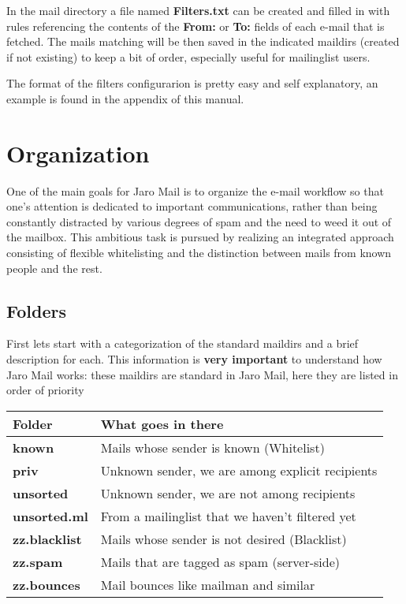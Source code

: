 \documentclass[a4,onecolumn,portrait]{article}
\begin{document}
In the mail directory a file named \textbf{Filters.txt} can be created and
filled in with rules referencing the contents of the \textbf{From:}
or \textbf{To:} fields of each e-mail that is fetched. The mails matching
will be then saved in the indicated maildirs (created if not
existing) to keep a bit of order, especially useful for mailinglist
users.

The format of the filters configurarion is pretty easy and self
explanatory, an example is found in the appendix of this manual.

\section{Organization}
\label{sec-5}

One of the main goals for Jaro Mail is to organize the e-mail workflow
so that one's attention is dedicated to important communications,
rather than being constantly distracted by various degrees of spam and
the need to weed it out of the mailbox. This ambitious task is pursued
by realizing an integrated approach consisting of flexible
whitelisting and the distinction between mails from known people and
the rest.

\subsection{Folders}
\label{sec-5-1}

First lets start with a categorization of the standard maildirs and a
brief description for each. This information is \textbf{very important} to
understand how Jaro Mail works: these maildirs are standard in Jaro
Mail, here they are listed in order of priority

\begin{center}
\begin{tabular}{ll}
Folder & What goes in there\\
\hline
\textbf{known} & Mails whose sender is known (Whitelist)\\
\textbf{priv} & Unknown sender, we are among explicit recipients\\
\textbf{unsorted} & Unknown sender, we are not among recipients\\
\textbf{unsorted.ml} & From a mailinglist that we haven't filtered yet\\
\textbf{zz.blacklist} & Mails whose sender is not desired (Blacklist)\\
\textbf{zz.spam} & Mails that are tagged as spam (server-side)\\
\textbf{zz.bounces} & Mail bounces like mailman and similar\\
\end{tabular}
\end{center}
\end{document}
